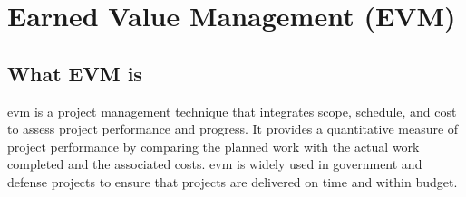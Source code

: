 \documentclass[../main.tex]{subfiles}
\begin{document}
\section{Earned Value Management (EVM)}
\minibib

\subsection{What EVM is}

\ac{evm} is a project management technique that integrates scope, schedule, and cost to assess project performance and progress. It provides a quantitative measure of project performance by comparing the planned work with the actual work completed and the associated costs.
\ac{evm} is widely used in government and defense projects to ensure that projects are delivered on time and within budget.
\end{document}
